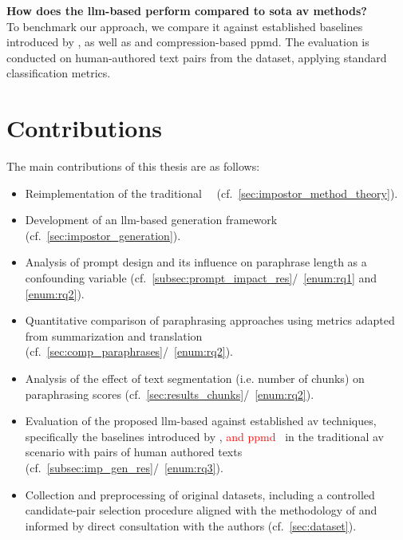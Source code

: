 \begin{questions}
    \item \textbf{How does the \ac{llm}-based \impAppr{} perform compared to \acl{sota} \ac{av} methods?} \label{enum:rq3} \hfill \\
    To benchmark our approach, we compare it against established baselines introduced by \citet{koppel_determining_2014}, as well as \unmasking{} and compression-based \ac{ppmd}. 
    The evaluation is conducted on human-authored text pairs from the \dataStudent{} dataset, applying standard classification metrics. 
    
\end{questions}



\section{Contributions}
\label{sec:contributions}
The main contributions of this thesis are as follows:
\begin{itemize}
    \item Reimplementation of the traditional \impAppr{}~\citep{koppel_determining_2014}\ (cf.~\autoref{sec:impostor_method_theory}).
    \item Development of an \ac{llm}-based \imp{} generation framework (cf.~\autoref{sec:impostor_generation}). 
    \item Analysis of prompt design and its influence on paraphrase length as a confounding variable (cf.~\autoref{subsec:prompt_impact_res}/~\ref{enum:rq1} and \ref{enum:rq2}).
    \item Quantitative comparison of paraphrasing approaches using metrics adapted from summarization and translation (cf.~\autoref{sec:comp_paraphrases}/~\ref{enum:rq2}).
    \item Analysis of the effect of text segmentation (i.e. number of chunks) on paraphrasing scores (cf.~\autoref{sec:results_chunks}/~\ref{enum:rq2}).
    \item Evaluation of the proposed \ac{llm}-based \impAppr{} against established \ac{av} techniques, specifically the baselines introduced by \citet{koppel_determining_2014}, \textcolor{red}{\unmasking{} and \ac{ppmd}}~\citep{koppel_determining_2014} in the traditional \ac{av} scenario with pairs of human authored texts (cf.~\autoref{subsec:imp_gen_res}/~\ref{enum:rq3}).
    \item Collection and preprocessing of original datasets, including a controlled candidate-pair selection procedure aligned with the methodology of \citet{koppel_determining_2014} and informed by direct consultation with the authors (cf.~\autoref{sec:dataset}).

\end{itemize}



